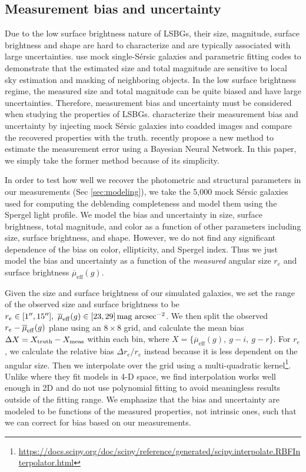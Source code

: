 \documentclass[twocolumn,astrosymb,twocolappendix]{aastex631}
\newcommand{\sbunit}{\mathrm{mag\ arcsec}^{-2}}
\newcommand{\sbeff}{\overline{\mu}_{\mathrm{eff}}(g)}
\newcommand{\sersic}{S\'ersic}
\begin{document}
\begin{CJK*}{UTF8}{gbsn}
\subsection{Measurement bias and uncertainty}\label{sec:meas_unc}

Due to the low surface brightness nature of LSBGs, their size, magnitude, surface brightness and shape are hard to characterize and are typically associated with large uncertainties. \citet{Haussler2007} use mock single-\sersic{} galaxies and parametric fitting codes to demonstrate that the estimated size and total magnitude are sensitive to local sky estimation and masking of neighboring objects. In the low surface brightness regime, the measured size and total magnitude can be quite biased and have large uncertainties. Therefore, measurement bias and uncertainty must be considered when studying the properties of LSBGs. \citet{Zaritsky2021,Zaritsky2022} characterize their measurement bias and uncertainty by injecting mock \sersic{} galaxies into coadded images and compare the recovered properties with the truth. \citet{Tanoglidis2022ICML} recently propose a new method to estimate the measurement error using a Bayesian Neural Network. In this paper, we simply take the former method because of its simplicity. 

In order to test how well we recover the photometric and structural parameters in our measurements (Sec \ref{sec:modeling}), we take the 5,000 mock \sersic{} galaxies used for computing the deblending completeness and model them using the Spergel light profile. We model the bias and uncertainty in size, surface brightness, total magnitude, and color as a function of other parameters including size, surface brightness, and shape. However, we do not find any significant dependence of the bias on color, ellipticity, and Spergel index. Thus we just model the bias and uncertainty as a function of the \textit{measured} angular size $r_e$ and surface brightness $\sbeff$.

Given the size and surface brightness of our simulated galaxies, we set the range of the observed size and surface brightness to be $r_e\in[1\arcsec, 15\arcsec],\ \sbeff\in[23, 29]\,\sbunit$. We then split the observed $r_e-\overline{\mu}_{\rm eff}(g)$ plane using an $8\times 8$ grid, and calculate the mean bias $\Delta X = X_{\rm truth} - X_{\rm meas}$ within each bin, where $X=\{\sbeff,\ g-i,\ g-r\}$. For $r_e$, we calculate the relative bias $\Delta r_e / r_e$ instead because it is less dependent on the angular size. Then we interpolate over the grid using a multi-quadratic kernel\footnote{\url{https://docs.scipy.org/doc/scipy/reference/generated/scipy.interpolate.RBFInterpolator.html}}. Unlike \citet{Zaritsky2021} where they fit models in 4-D space, we find interpolation works well enough in 2D and do not use polynomial fitting to avoid meaningless results outside of the fitting range. We emphasize that the bias and uncertainty are modeled to be functions of the measured properties, not intrinsic ones, such that we can correct for bias based on our measurements. 


\end{CJK*}
\end{document}
